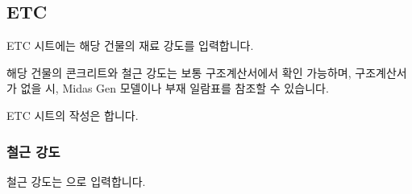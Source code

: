 \documentclass[a4paper,10pt,korean]{sphinxmanual}
\begin{document}
\begin{figure}[htbp]
\centering
\capstart

\noindent{}
\caption{}\label{\detokenize{2_naming_rules:id5}}\end{figure}

\sphinxstepscope


\subsection{ETC}
\label{\detokenize{2_etc:etc}}\label{\detokenize{2_etc::doc}}
\sphinxAtStartPar
ETC 시트에는 해당 건물의 재료 강도를 입력합니다.

\sphinxAtStartPar
해당 건물의 콘크리트와 철근 강도는 보통 구조계산서에서 확인 가능하며,
구조계산서가 없을 시, Midas Gen 모델이나 부재 일람표를 참조할 수 있습니다.

\sphinxAtStartPar
ETC 시트의 작성은 합니다.


\subsubsection{철근 강도}
\label{\detokenize{2_etc:id1}}
\sphinxAtStartPar
철근 강도는 으로 입력합니다.
\end{document}
